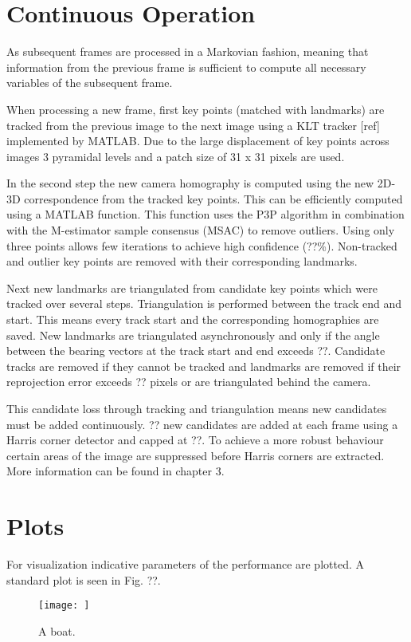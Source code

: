 \section{Continuous Operation}
As subsequent frames are processed in a Markovian fashion, meaning that information from the previous frame is sufficient to compute all necessary variables of the subsequent frame. \par
When processing a new frame, first key points (matched with landmarks) are tracked from the previous image to the next image using a KLT tracker [ref] implemented by MATLAB. Due to the large displacement of key points across images 3 pyramidal levels and a patch size of 31 x 31 pixels are used. \par
In the second step the new camera homography is computed using the new 2D-3D correspondence from the tracked key points. This can be efficiently computed using a MATLAB function. This function uses the P3P algorithm in combination with the M-estimator sample consensus (MSAC) to remove outliers. Using only three points allows few iterations to achieve high confidence (??\%). Non-tracked and outlier key points are removed with their corresponding landmarks.\par
Next new landmarks are triangulated from candidate key points which were tracked over several steps. Triangulation is performed between the track end and start. This means every track start and the corresponding homographies are saved. New landmarks are triangulated asynchronously and only if the angle between the bearing vectors at the track start and end exceeds ??. Candidate tracks are removed if they cannot be tracked and landmarks are removed if their reprojection error exceeds ?? pixels or are triangulated behind the camera.\par
This candidate loss through tracking and triangulation means new candidates must be added continuously. ?? new candidates are added at each frame using a Harris corner detector and capped at ??. To achieve a more robust behaviour certain areas of the image are suppressed before Harris corners are extracted. More information can be found in chapter 3. 

\section{Plots}
For visualization indicative parameters of the performance are plotted. A standard plot is seen in Fig. ??.  

\begin{figure}
  \texttt{[image: ]}
  \caption{A boat.}
  \label{fig:boat1}
\end{figure}

